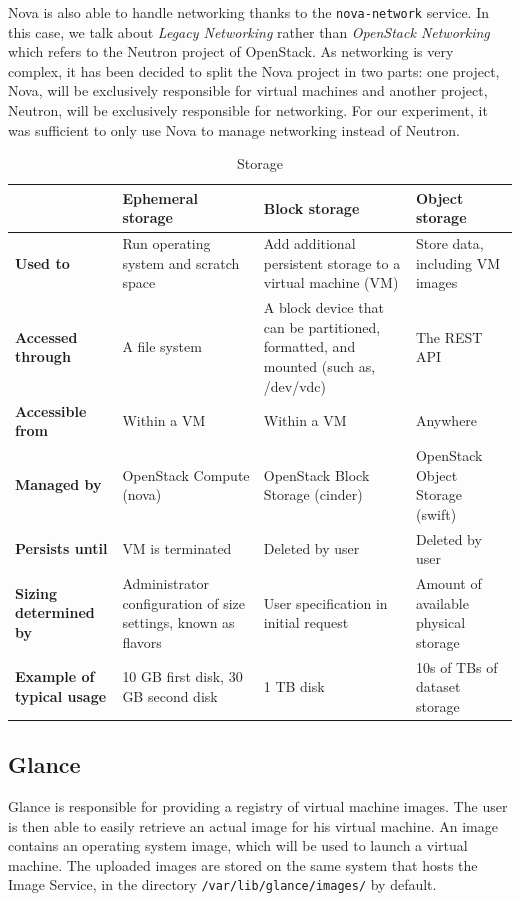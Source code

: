 Nova is also able to handle networking thanks to the \texttt{nova-network} service. 
In this case, we talk about \textit{Legacy Networking} rather than \textit{OpenStack Networking} which refers to the Neutron project of OpenStack. 
As networking is very complex, it has been decided to split the Nova project in two parts: one project, Nova, will be exclusively responsible for virtual machines and another project, Neutron, will be exclusively responsible for networking. 
For our experiment, it was sufficient to only use Nova to manage networking instead of Neutron.


\begin{table}[h]
	\centering
	\begin{tabular}{|m{2cm}|m{3.8cm}|m{3.8cm}|m{3.8cm}|}
		\hline
		 & 
		\textbf{Ephemeral \newline storage} & 
		\textbf{Block storage} & 
		\textbf{Object storage}\\
		\hline
		\textbf{Used to} & 
		Run operating system and scratch space & 
		Add additional persistent storage to a virtual machine (VM) & 
		Store data, including VM images \\
		\hline
		\textbf{Accessed through} & 
		A file system & 
		A block device that can be partitioned, formatted, and mounted (such as, /dev/vdc) & 
		The REST API \\
		\hline
		\textbf{Accessible from} & 
		Within a VM & 
		Within a VM & 
		Anywhere \\
		\hline
		\textbf{Managed by} & 
		OpenStack Compute (nova) & 
		OpenStack Block Storage (cinder) & 
		OpenStack Object Storage (swift) \\
		\hline
		\textbf{Persists until} & 
		VM is terminated & 
		Deleted by user & 
		Deleted by user \\
		\hline
		\textbf{Sizing determined by} & 
		Administrator configuration of size settings, known as flavors & 
		User specification in initial request & 
		Amount of available physical storage \\
		\hline
		\textbf{Example of typical usage} & 
		10 GB first disk, 30 GB second disk & 
		1 TB disk & 
		10s of TBs of dataset storage \\
		\hline
	\end{tabular}
	\caption{Storage \cite{stodec}}
	\label{table:storage_list}
\end{table}



\subsection{Glance}
Glance is responsible for providing a registry of virtual machine images. 
The user is then able to easily retrieve an actual image for his virtual machine. 
An image contains an operating system image, which will be used to launch a virtual machine. 
The uploaded images are stored on the same system that hosts the Image Service, in the directory \texttt{/var/lib/glance/images/} by default.

